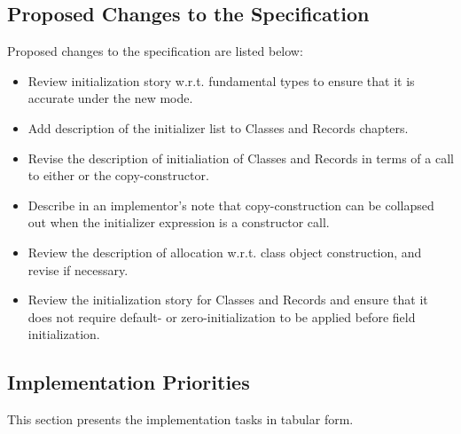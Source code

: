 \subsection{Proposed Changes to the Specification}

Proposed changes to the specification are listed below:
\begin{itemize}
\item Review initialization story w.r.t. fundamental types to ensure that it is accurate
  under the new mode.
\item Add description of the initializer list to Classes and Records chapters.
\item Revise the description of initialiation of Classes and Records in terms of a call to
  either  or the copy-constructor.
\item Describe in an implementor's note that copy-construction can be collapsed out when
  the initializer expression is a constructor call.
\item Review the description of allocation w.r.t. class object construction, and revise if
  necessary.
\item Review the initialization story for Classes and Records and ensure that it does not
  require default- or zero-initialization to be applied before field initialization.
\end{itemize}

\subsection{Implementation Priorities}

This section presents the implementation tasks in tabular form.

